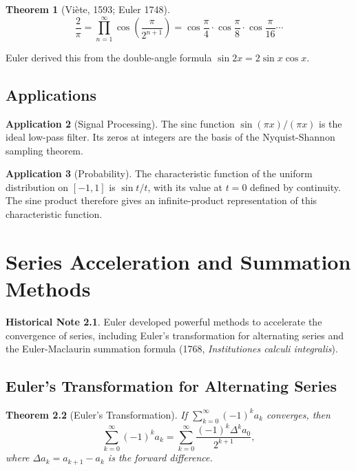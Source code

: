 \documentclass[11pt,a4paper,twoside]{book}
\theoremstyle{eulerstyle}
\newtheorem{theorem}{Theorem}[chapter]
\theoremstyle{definition}
\newtheorem{historical}[theorem]{Historical Note}
\newtheorem{application}[theorem]{Application}
\begin{document}
\begin{theorem}[Viète, 1593; Euler 1748]
\[
\frac{2}{\pi} = \prod_{n=1}^\infty \cos\left(\frac{\pi}{2^{n+1}}\right)
= \cos\frac{\pi}{4} \cdot \cos\frac{\pi}{8} \cdot \cos\frac{\pi}{16} \cdots
\]
\end{theorem}

Euler derived this from the double-angle formula $\sin 2x = 2 \sin x \cos x$.

\section{Applications}

\begin{application}[Signal Processing]
The sinc function $\sin(\pi x)/(\pi x)$ is the ideal low-pass filter. Its zeros at integers are the basis of the Nyquist-Shannon sampling theorem.
\end{application}

\begin{application}[Probability]
The characteristic function of the uniform distribution on $[-1,1]$ is
$\sin t / t$, with its value at $t=0$ defined by continuity. The sine product
therefore gives an infinite-product representation of this characteristic
function.
\end{application}

\cleardoublepage

\chapter{Series Acceleration and Summation Methods}
\label{ch:acceleration}

\begin{historical}
Euler developed powerful methods to accelerate the convergence of series, including Euler's transformation for alternating series and the Euler-Maclaurin summation formula (1768, \emph{Institutiones calculi integralis}). \cite{euler1768}\end{historical}

\section{Euler's Transformation for Alternating Series}

\begin{theorem}[Euler's Transformation]
If $\sum_{k=0}^\infty (-1)^k a_k$ converges, then
\[
\sum_{k=0}^\infty (-1)^k a_k = \sum_{k=0}^\infty \frac{(-1)^k \Delta^k a_0}{2^{k+1}},
\]
where $\Delta a_k = a_{k+1} - a_k$ is the forward difference.
\end{theorem}
\end{document}
